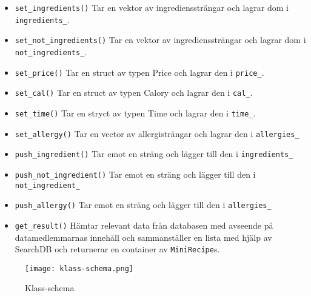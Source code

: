 \begin{itemize}
\item \verb+set_ingredients()+ Tar en vektor av ingredienssträngar och lagrar
  dom i \verb+ingredients_+.

\item \verb+set_not_ingredients()+ Tar en vektor av ingredienssträngar och lagrar
  dom i \verb+not_ingredients_+.

\item \verb+set_price()+ Tar en struct av typen Price och lagrar den i
  \verb+price_+.

\item \verb+set_cal()+ Tar en struct av typen Calory och lagrar den i \verb+cal_+.

\item \verb+set_time()+ Tar en stryct av typen Time och lagrar den i
  \verb+time_+.

\item \verb+set_allergy()+ Tar en vector av allergisträngar och lagrar den i
  \verb+allergies_+

\item \verb+push_ingredient()+ Tar emot en sträng och lägger till den i
  \verb+ingredients_+

\item \verb+push_not_ingredient()+ Tar emot en sträng och lägger till den i
  \verb+not_ingredient_+

\item \verb+push_allergy()+ Tar emot en sträng och lägger till den i \verb+allergies_+


\item \verb+get_result()+ Hämtar relevant data från databasen med avseende på
  datamedlemmarnas innehåll och sammanställer en lista med hjälp av SearchDB och
  returnerar en container av \verb+MiniRecipe+s. 

\end{itemize}

\begin{figure}[h]
\centering
\texttt{[image: klass-schema.png]}
\caption{Klass-schema}
\label{fig:classes}
\end{figure}
